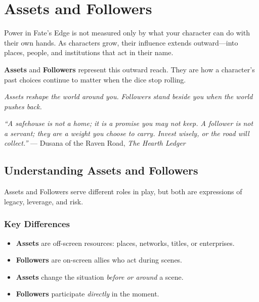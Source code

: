 \chapter{Assets and Followers}
\label{ch:assets-followers}

Power in Fate's Edge is not measured only by what your character can do with their own hands.  
As characters grow, their influence extends outward---into places, people, and institutions that act in their name.

\textbf{Assets} and \textbf{Followers} represent this outward reach.  
They are how a character's past choices continue to matter when the dice stop rolling.

\emph{Assets reshape the world around you.}  
\emph{Followers stand beside you when the world pushes back.}

\begin{tcolorbox}[colback=green!5!white,colframe=green!75!black,title=A Word from the Raven Road,breakable]
\emph{``A safehouse is not a home; it is a promise you may not keep. A follower is not a servant; they are a weight you choose to carry. Invest wisely, or the road will collect.''}  
\vspace{0.2cm}\hfill --- Dusana of the Raven Road, \textit{The Hearth Ledger}
\end{tcolorbox}

\section{Understanding Assets and Followers}
\label{sec:assets-followers-overview}

Assets and Followers serve different roles in play, but both are expressions of legacy, leverage, and risk.

\subsection*{Key Differences}
\begin{itemize}
\item \textbf{Assets} are off-screen resources: places, networks, titles, or enterprises.
\item \textbf{Followers} are on-screen allies who act during scenes.
\item \textbf{Assets} change the situation \emph{before or around} a scene.
\item \textbf{Followers} participate \emph{directly} in the moment.
\end{itemize}

